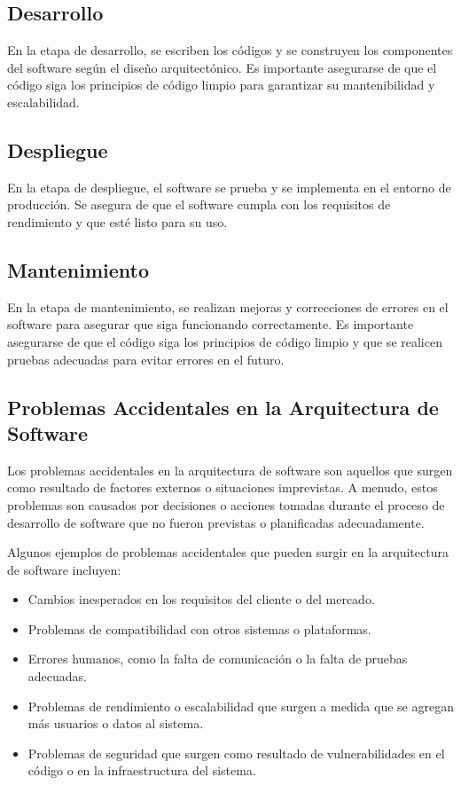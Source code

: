 \documentclass[executivepaper]{article}
\begin{document}
\subsection*{Desarrollo}
En la etapa de desarrollo, se escriben los códigos y se construyen los componentes del software según el diseño arquitectónico. Es importante asegurarse de que el código siga los principios de código limpio para garantizar su mantenibilidad y escalabilidad.

\subsection*{Despliegue}
En la etapa de despliegue, el software se prueba y se implementa en el entorno de producción. Se asegura de que el software cumpla con los requisitos de rendimiento y que esté listo para su uso.

\subsection*{Mantenimiento}
En la etapa de mantenimiento, se realizan mejoras y correcciones de errores en el software para asegurar que siga funcionando correctamente. Es importante asegurarse de que el código siga los principios de código limpio y que se realicen pruebas adecuadas para evitar errores en el futuro.


\subsection{Problemas Accidentales en la Arquitectura de Software}

Los problemas accidentales en la arquitectura de software son aquellos que surgen como resultado de factores externos o situaciones imprevistas. A menudo, estos problemas son causados por decisiones o acciones tomadas durante el proceso de desarrollo de software que no fueron previstas o planificadas adecuadamente.

Algunos ejemplos de problemas accidentales que pueden surgir en la arquitectura de software incluyen:

\begin{itemize}
\item Cambios inesperados en los requisitos del cliente o del mercado.
\item Problemas de compatibilidad con otros sistemas o plataformas.
\item Errores humanos, como la falta de comunicación o la falta de pruebas adecuadas.
\item Problemas de rendimiento o escalabilidad que surgen a medida que se agregan más usuarios o datos al sistema.
\item Problemas de seguridad que surgen como resultado de vulnerabilidades en el código o en la infraestructura del sistema.
\end{itemize}
\end{document}
